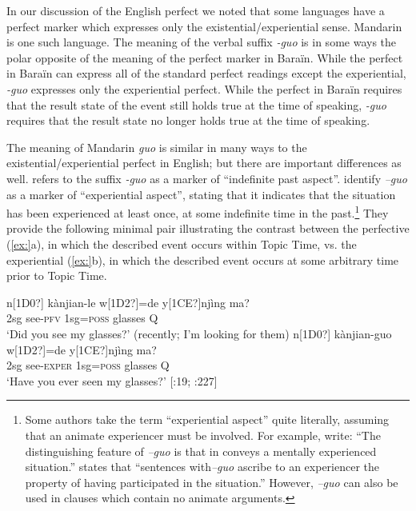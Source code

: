 In our discussion of the English perfect we noted that some languages have a perfect marker which expresses only the existential/experiential sense. Mandarin is one such language. The meaning of the verbal suffix \textit{-guo} is in some ways the polar opposite of the meaning of the perfect marker in Baraïn. While the perfect in Baraïn can express all of the standard perfect readings except the experiential, \textit{-guo} expresses only the experiential perfect. While the perfect in Baraïn requires that the result state of the event still holds true at the time of speaking, \textit{-guo} requires that the result state no longer holds true at the time of speaking.



The meaning of Mandarin \textit{guo} is similar in many ways to the existential/experiential perfect in English; but there are important differences as well. \citet{Chao1968} refers to the suffix \textit{-guo} as a marker of “indefinite past aspect”. \citet[226]{LiThompson1981} identify \textit{–guo} as a marker of “experiential aspect”, stating that it indicates that the situation has been experienced at least once, at some indefinite time in the past.\footnote{Some authors take the term “experiential aspect” quite literally, assuming that an animate experiencer must be involved. For example, \citet[144]{XiaoMcEnery2004} write: “The distinguishing feature of \textit{–guo} is that in conveys a mentally experienced situation.” \citet[267]{Smith1997} states that “sentences with\textit{–guo} ascribe to an experiencer the property of having participated in the situation.” However, \textit{–guo} can also be used in clauses which contain no animate arguments.} They provide the following minimal pair illustrating the contrast between the perfective (\ref{ex:}a), in which the described event occurs within Topic Time, vs. the experiential (\ref{ex:}b), in which the described event occurs at some arbitrary time prior to Topic Time.


\ea
\ea  \gll n[1D0?]  kànjian-le  w[1D2?]=de  y[1CE?]njìng  ma?\\
2sg  see-\textsc{pfv}  1sg=\textsc{poss}  glasses  Q\\
\glt ‘Did you see my glasses?’ (recently; I’m looking for them)
\ex \gll  n[1D0?]  kànjian-guo  w[1D2?]=de  y[1CE?]njìng  ma?\\
2sg  see-\textsc{exper}  1sg=\textsc{poss}  glasses  Q\\
\glt ‘Have you ever seen my glasses?’  [\citealt{Ma1977}:19; \citealt{LiThompson1981}:227]
\z \z


